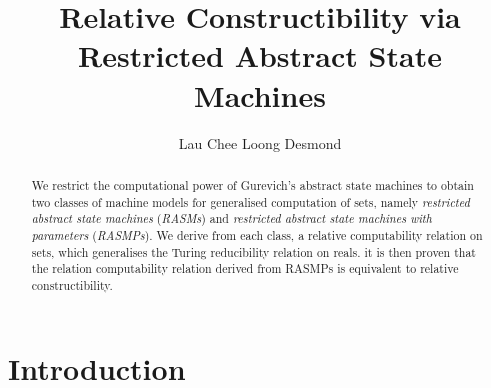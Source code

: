 \documentclass[12pt]{article}
\title{Relative Constructibility via Restricted Abstract State Machines}
\author{Lau Chee Loong Desmond}
\numberwithin{equation}{section}
\begin{document}
\maketitle

\begin{abstract}
We restrict the computational power of Gurevich's abstract state machines to obtain two classes of machine models for generalised computation of sets, namely \textit{restricted abstract state machines} (\textit{RASMs}) and \textit{restricted abstract state machines with parameters} (\textit{RASMPs}). We derive from each class, a relative computability relation on sets, which generalises the Turing reducibility relation on reals. it is then proven that the relation computability relation derived from RASMPs is equivalent to relative constructibility.
\end{abstract}

\newtheorem{thm}{Theorem}[section]
\newtheorem{innercustomlem}{Lemma}
\newenvironment{customlem}[1]
  {\renewcommand\theinnercustomlem{#1}\innercustomlem}
  {\endinnercustomlem}
\newtheorem{innercustomdef}{Definition}
\newenvironment{customdef}[1]
  {\renewcommand\theinnercustomdef{#1}\innercustomdef}
  {\endinnercustomdef}
\newtheorem{lem}[thm]{Lemma}
\newtheorem{prop}[thm]{Proposition}
\newtheorem{cor}[thm]{Corollary}
\newtheorem{conj}[thm]{Conjecture}
\newtheorem{ques}[thm]{Question}
\newtheorem*{claim}{Claim}
\theoremstyle{definition}
\newtheorem{defi}[thm]{Definition}
\theoremstyle{remark}
\newtheorem*{rem*}{Remark}
\newtheorem{rem}[thm]{Remark}
\newtheorem{ex}[thm]{Example}
\newtheorem{ob}[thm]{Observation}
\newtheorem{fact}[thm]{Fact}
\newtheorem{con}[thm]{Convention}
\newtheorem{diff}[thm]{Difficulty}

\newcommand{\bd}[1]{\mathbf{#1}}  %
\newcommand{\RR}{\mathbb{R}}      %
\newcommand{\ZZ}{\mathbb{Z}}      %
\newcommand{\col}[1]{\left[\begin{matrix} #1 \end{matrix} \right]}
\newcommand{\comb}[2]{\binom{#1^2 + #2^2}{#1+#2}}
\newcommand{\eq}{=}

\newcommand{\blankpage}{
\newpage
\thispagestyle{empty}
\mbox{}
\newpage
}

{\let\clearpage\relax \tableofcontents} 
\thispagestyle{empty}

\section{Introduction}\label{sect1}
\end{document}
